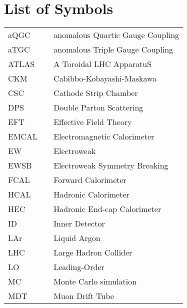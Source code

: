 \chapter*{List of Symbols}
  \begin{tabular}{lp{}p{}}
    aQGC        & \dotfill & anomalous Quartic Gauge Coupling \\
    aTGC         & \dotfill & anomalous Triple Gauge Coupling \\
    ATLAS       & \dotfill & A Toroidal LHC ApparatuS \\
    CKM         & \dotfill & Cabibbo-Kobayashi-Maskawa \\
    CSC         & \dotfill & Cathode Strip Chamber \\
    DPS         & \dotfill & Double Parton Scattering \\
    EFT         & \dotfill & Effective Field Theory \\
    EMCAL       & \dotfill & Electromagnetic Calorimeter \\
    EW          & \dotfill & Electroweak \\
    EWSB        & \dotfill & Electroweak Symmetry Breaking \\
    FCAL        & \dotfill & Forward Calorimeter \\
    HCAL        & \dotfill & Hadronic Calorimeter \\
    HEC         & \dotfill & Hadronic End-cap Calorimeter \\
    ID          & \dotfill & Inner Detector \\
    LAr         & \dotfill & Liquid Argon \\
    LHC         & \dotfill & Large Hadron Collider \\
    LO          & \dotfill & Leading-Order \\
    MC          & \dotfill & Monte Carlo simulation \\
    MDT         & \dotfill & Muon Drift Tube \\
  \end{tabular}

